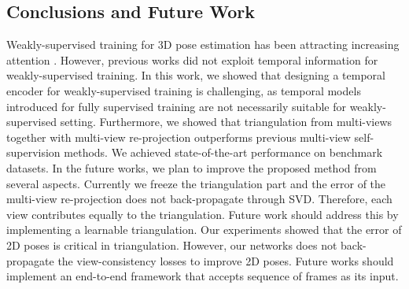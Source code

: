\documentclass[10pt,twocolumn,letterpaper]{article}
\begin{document}
\subsection{Conclusions and Future Work}
Weakly-supervised training for 3D pose estimation has been attracting increasing attention \cite{Wandt_2019_CVPR, Iqbal_2020_CVPR, Kocabas_2019_CVPR}. However, previous works did not exploit temporal information for weakly-supervised training. In this work, we showed that designing a temporal encoder for weakly-supervised training is challenging, as temporal models introduced for fully supervised training are not necessarily suitable for weakly-supervised setting. Furthermore, we showed that triangulation from multi-views together with multi-view re-projection outperforms previous multi-view self-supervision methods. We achieved state-of-the-art performance on benchmark datasets. In the future works, we plan to improve the proposed method from several aspects. Currently we freeze the triangulation part and the error of the multi-view re-projection does not back-propagate through SVD. Therefore, each view contributes equally to the triangulation. Future work should address this by implementing a learnable triangulation\cite{Iskakov_2019_ICCV}. Our experiments showed that the error of 2D poses is critical in triangulation. However, our networks does not back-propagate the view-consistency losses to improve 2D poses. Future works should implement an end-to-end framework that accepts sequence of frames as its input. 
















{\small


}
\end{document}
